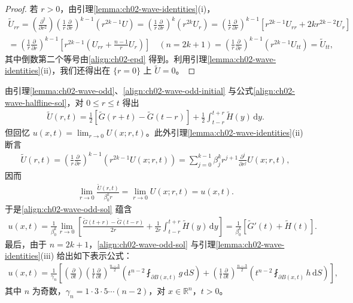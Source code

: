 \documentclass[../../main.tex]{subfiles}
\begin{document}
\begin{proof}
若 $r>0$，由引理\cref{lemma:ch02-wave-identities}(i)，
\begin{align*}
\widetilde{U}_{rr}=\left(\frac{\partial^2}{\partial r^2}\right)\left(\frac{1}{r}\frac{\partial}{\partial r}\right)^{k-1}(r^{2k-1}U)
=\left(\frac{1}{r}\frac{\partial}{\partial r}\right)^k(r^{2k}U_r)
=\left(\frac{1}{r}\frac{\partial}{\partial r}\right)^{k-1}[r^{2k-1}U_{rr}+2k r^{2k-2}U_r]\\
=\left(\frac{1}{r}\frac{\partial}{\partial r}\right)^{k-1}\left[r^{2k-1}\left(U_{rr}+\frac{n-1}{r}U_r\right)\right]\quad(n=2k+1)
=\left(\frac{1}{r}\frac{\partial}{\partial r}\right)^{k-1}(r^{2k-1}U_{tt})=\widetilde{U}_{tt},
\end{align*}
其中倒数第二个等号由\eqref{align:ch02-epd} 得到。利用引理\cref{lemma:ch02-wave-identities}(ii)，我们还得出在 $\{r=0\}$ 上 $\widetilde{U}=0$。
\end{proof}

由引理\cref{lemma:ch02-wave-odd}、\eqref{align:ch02-wave-odd-initial} 与公式\eqref{align:ch02-wave-halfline-sol}，对 $0\leqslant r\leqslant t$ 得出
\begin{align}\label{align:ch02-wave-odd-sol}
\widetilde{U}(r,t)=\frac{1}{2}[\widetilde{G}(r+t)-\widetilde{G}(t-r)]+\frac{1}{2}\int_{t-r}^{t+r}\widetilde{H}(y)\,\mathrm{d}y.
\end{align}
但回忆 $u(x,t)=\lim_{r\to 0}U(x;r,t)$。此外引理\cref{lemma:ch02-wave-identities}(ii) 断言
\begin{align*}
\widetilde{U}(r,t)=\left(\frac{1}{r}\frac{\partial}{\partial r}\right)^{k-1}(r^{2k-1}U(x;r,t))
=\sum_{j=0}^{k-1}\beta_j^k r^{j+1}\frac{\partial^j}{\partial r^j}U(x;r,t),
\end{align*}
因而
\begin{align*}
\lim_{r\to 0}\frac{\widetilde{U}(r,t)}{\beta_0^k r}=\lim_{r\to 0}U(x;r,t)=u(x,t).
\end{align*}
于是\eqref{align:ch02-wave-odd-sol} 蕴含
\begin{align*}
u(x,t)=\frac{1}{\beta_0^k}\lim_{r\to 0}\left[\frac{\widetilde{G}(t+r)-\widetilde{G}(t-r)}{2r}+\frac{1}{2r}\int_{t-r}^{t+r}\widetilde{H}(y)\,\mathrm{d}y\right]
=\frac{1}{\beta_0^k}[\widetilde{G}'(t)+\widetilde{H}(t)].
\end{align*}
最后，由于 $n=2k+1$，\eqref{align:ch02-wave-odd-sol} 与引理\cref{lemma:ch02-wave-identities}(iii) 给出如下表示公式：
\begin{align}\label{align:ch02-wave-odd-formula}
u(x,t)=\frac{1}{\gamma_n}\left[\left(\frac{\partial}{\partial t}\right)\left(\frac{1}{t}\frac{\partial}{\partial t}\right)^{\frac{n-3}{2}}\left(t^{n-2}\fint_{\partial B(x,t)}g\,\mathrm{d}S\right)
+\left(\frac{1}{t}\frac{\partial}{\partial t}\right)^{\frac{n-3}{2}}\left(t^{n-2}\fint_{\partial B(x,t)}h\,\mathrm{d}S\right)\right],
\end{align}
其中 $n$ 为奇数，$\gamma_n=1\cdot 3\cdot 5\cdots(n-2)$，对 $x\in\mathbb{R}^n$，$t>0$。
\end{document}
